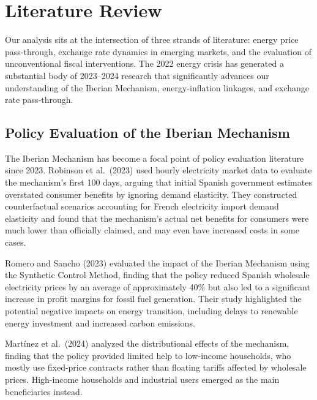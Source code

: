 \documentclass[12pt, a4paper]{article}
\begin{document}

\section{Literature Review}

Our analysis sits at the intersection of three strands of literature: energy price pass-through, exchange rate dynamics in emerging markets, and the evaluation of unconventional fiscal interventions. The 2022 energy crisis has generated a substantial body of 2023--2024 research that significantly advances our understanding of the Iberian Mechanism, energy-inflation linkages, and exchange rate pass-through.


\subsection{Policy Evaluation of the Iberian Mechanism}

The Iberian Mechanism has become a focal point of policy evaluation literature since 2023. Robinson et al.\ (2023) used hourly electricity market data to evaluate the mechanism's first 100 days, arguing that initial Spanish government estimates overstated consumer benefits by ignoring demand elasticity. They constructed counterfactual scenarios accounting for French electricity import demand elasticity and found that the mechanism's actual net benefits for consumers were much lower than officially claimed, and may even have increased costs in some cases.

Romero and Sancho (2023) evaluated the impact of the Iberian Mechanism using the Synthetic Control Method, finding that the policy reduced Spanish wholesale electricity prices by an average of approximately 40\% but also led to a significant increase in profit margins for fossil fuel generation. Their study highlighted the potential negative impacts on energy transition, including delays to renewable energy investment and increased carbon emissions.

Mart\'{i}nez et al.\ (2024) analyzed the distributional effects of the mechanism, finding that the policy provided limited help to low-income households, who mostly use fixed-price contracts rather than floating tariffs affected by wholesale prices. High-income households and industrial users emerged as the main beneficiaries instead.
\end{document}
